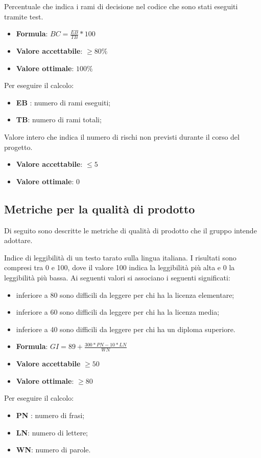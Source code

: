 Percentuale che indica i rami di decisione nel codice che sono stati eseguiti tramite test.
\begin{itemize}
    \item \textbf{Formula}: $BC = \frac{EB}{TB}*100$
    \item \textbf{Valore accettabile}: $\geq80\%$
    \item \textbf{Valore ottimale}: $100\%$
\end{itemize}  
Per eseguire il calcolo:
\begin{itemize}
    \item \textbf{EB} : numero di rami eseguiti;
    \item \textbf{TB}: numero di rami totali;
\end{itemize}

Valore intero che indica il numero di rischi non previsti durante il corso del progetto.
\begin{itemize}
    \item \textbf{Valore accettabile}: $\leq5$
    \item \textbf{Valore ottimale}: $0$
\end{itemize}  


\pagebreak
\setcounter{M}{0}
\subsection{Metriche per la qualità di prodotto}
Di seguito sono descritte le metriche di qualità di prodotto che il gruppo intende adottare.

Indice di leggibilità di un testo tarato sulla lingua italiana. I risultati sono compresi tra 0 e
100, dove il valore 100 indica la leggibilità più alta e 0 la leggibilità più bassa. Ai seguenti valori si
associano i seguenti significati:
\begin{itemize}
    \item inferiore a 80 sono difficili da leggere per chi ha la licenza elementare;
    \item inferiore a 60 sono difficili da leggere per chi ha la licenza media;
    \item inferiore a 40 sono difficili da leggere per chi ha un diploma superiore.
\end{itemize}
\begin{itemize}
    \item \textbf{Formula}: $GI=89+\frac{300*PN-10*LN}{WN}$
    \item \textbf{Valore accettabile} $\geq50$
    \item \textbf{Valore ottimale}: $\geq80$
\end{itemize}  
Per eseguire il calcolo:
\begin{itemize}
    \item \textbf{PN} : numero di frasi;
    \item \textbf{LN}: numero di lettere;
    \item \textbf{WN}: numero di parole.
\end{itemize}


